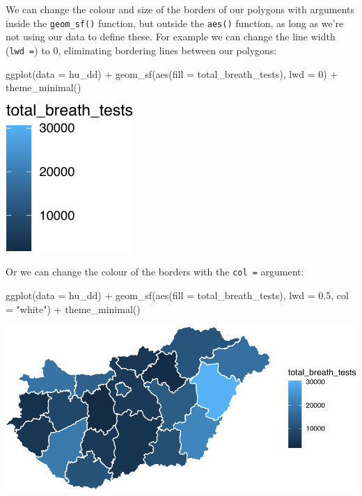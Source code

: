 \documentclass[
]{book}
\newenvironment{Shaded}{\begin{snugshade}}{\end{snugshade}}
\newcommand{\AttributeTok}[1]{\textcolor[rgb]{0.77,0.63,0.00}{#1}}
\newcommand{\DecValTok}[1]{\textcolor[rgb]{0.00,0.00,0.81}{#1}}
\newcommand{\FloatTok}[1]{\textcolor[rgb]{0.00,0.00,0.81}{#1}}
\newcommand{\FunctionTok}[1]{\textcolor[rgb]{0.00,0.00,0.00}{#1}}
\newcommand{\NormalTok}[1]{#1}
\newcommand{\SpecialCharTok}[1]{\textcolor[rgb]{0.00,0.00,0.00}{#1}}
\newcommand{\StringTok}[1]{\textcolor[rgb]{0.31,0.60,0.02}{#1}}
\begin{document}
We can change the colour and size of the borders of our polygons with arguments inside the \texttt{geom\_sf()} function, but outside the \texttt{aes()} function, as long as we're not using our data to define these. For example we can change the line width (\texttt{lwd\ =}) to 0, eliminating bordering lines between our polygons:

\begin{Shaded}
\begin{Highlighting}[]
\FunctionTok{ggplot}\NormalTok{(}\AttributeTok{data =}\NormalTok{ hu\_dd) }\SpecialCharTok{+} 
  \FunctionTok{geom\_sf}\NormalTok{(}\FunctionTok{aes}\NormalTok{(}\AttributeTok{fill =}\NormalTok{ total\_breath\_tests), }\AttributeTok{lwd =} \DecValTok{0}\NormalTok{) }\SpecialCharTok{+} 
  \FunctionTok{theme\_minimal}\NormalTok{()}
\end{Highlighting}
\end{Shaded}

\includegraphics{crime_mapping_files/figure-latex/themmapnobord-1.pdf}

Or we can change the colour of the borders with the \texttt{col\ =} argument:

\begin{Shaded}
\begin{Highlighting}[]
\FunctionTok{ggplot}\NormalTok{(}\AttributeTok{data =}\NormalTok{ hu\_dd) }\SpecialCharTok{+} 
  \FunctionTok{geom\_sf}\NormalTok{(}\FunctionTok{aes}\NormalTok{(}\AttributeTok{fill =}\NormalTok{ total\_breath\_tests), }\AttributeTok{lwd =} \FloatTok{0.5}\NormalTok{, }\AttributeTok{col =} \StringTok{"white"}\NormalTok{) }\SpecialCharTok{+} 
  \FunctionTok{theme\_minimal}\NormalTok{()}
\end{Highlighting}
\end{Shaded}

\includegraphics{crime_mapping_files/figure-latex/themmapwhitebord-1.pdf}
\end{document}
